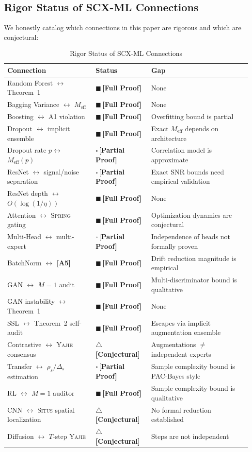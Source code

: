 \documentclass[12pt,a4paper]{article}
\theoremstyle{definition}
\newcommand{\rigorFull}{{\color{rigorcolor}$\blacksquare$\,\textbf{[Full Proof]}}}
\newcommand{\rigorPartial}{{\color{rigorcolor}$\square$\,\textbf{[Partial Proof]}}}
\newcommand{\rigorConjectural}{{\color{red!70!black}$\triangle$\,\textbf{[Conjectural]}}}
\newcommand{\Situs}{\textsc{Situs}}
\newcommand{\Yajie}{\textsc{Yajie}}
\newcommand{\Spring}{\textsc{Spring}}
\newcommand{\asmTag}[1]{\textsf{\textbf{[A#1]}}}
\begin{document}
\subsection{Rigor Status of SCX-ML Connections}

We honestly catalog which connections in this paper are rigorous and which are conjectural:

\begin{table}[h]
\centering
\caption{Rigor Status of SCX-ML Connections}
\label{tab:rigor_status}
\begin{tabular}{@{}lll@{}}
\toprule
\textbf{Connection} & \textbf{Status} & \textbf{Gap} \\
\midrule
Random Forest $\leftrightarrow$ Theorem~1 & \rigorFull & None \\
Bagging Variance $\leftrightarrow$ $M_{\text{eff}}$ & \rigorFull & None \\
Boosting $\leftrightarrow$ A1 violation & \rigorFull & Overfitting bound is partial \\
Dropout $\leftrightarrow$ implicit ensemble & \rigorFull & Exact $M_{\text{eff}}$ depends on architecture \\
Dropout rate $p \leftrightarrow$ $M_{\text{eff}}(p)$ & \rigorPartial & Correlation model is approximate \\
ResNet $\leftrightarrow$ signal/noise separation & \rigorPartial & Exact SNR bounds need empirical validation \\
ResNet depth $\leftrightarrow$ $O(\log(1/\eta))$ & \rigorFull & None \\
Attention $\leftrightarrow$ \Spring{} gating & \rigorFull & Optimization dynamics are conjectural \\
Multi-Head $\leftrightarrow$ multi-expert & \rigorPartial & Independence of heads not formally proven \\
BatchNorm $\leftrightarrow$ \asmTag{5} & \rigorFull & Drift reduction magnitude is empirical \\
GAN $\leftrightarrow$ $M=1$ audit & \rigorFull & Multi-discriminator bound is qualitative \\
GAN instability $\leftrightarrow$ Theorem~1 & \rigorFull & None \\
SSL $\leftrightarrow$ Theorem~2 self-audit & \rigorFull & Escapes via implicit augmentation ensemble \\
Contrastive $\leftrightarrow$ \Yajie{} consensus & \rigorConjectural & Augmentations $\neq$ independent experts \\
Transfer $\leftrightarrow$ $\rho_s/\Delta_s$ estimation & \rigorPartial & Sample complexity bound is PAC-Bayes style \\
RL $\leftrightarrow$ $M=1$ auditor & \rigorFull & Sample complexity bound is qualitative \\
CNN $\leftrightarrow$ \Situs{} spatial localization & \rigorConjectural & No formal reduction established \\
Diffusion $\leftrightarrow$ $T$-step \Yajie{} & \rigorConjectural & Steps are not independent \\
\bottomrule
\end{tabular}
\end{table}
\end{document}
